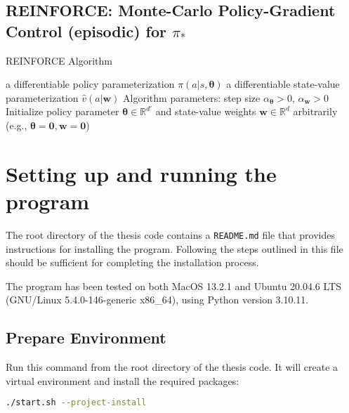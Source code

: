 \documentclass[../xlapes02]{subfiles}
\begin{document}
    \section{REINFORCE: Monte-Carlo Policy-Gradient Control (episodic) for $\pi_*$}
    \begin{algorithm}[h!]
        \caption{REINFORCE Algorithm}
        \label{alg:REINFORCE}

        a differentiable policy parameterization $\pi(a|s, \bm{\theta})$\;
        a differentiable state-value parameterization $\hat{v}(a|\bm{w})$\;
        Algorithm parameters: step size $\alpha_{\bm{\theta}} > 0$, $\alpha_{\bm{w}} > 0$\;
        Initialize policy parameter $\bm{\theta} \in \mathbb{R}^{d'}$ and state-value weights $\bm{w} \in \mathbb{R}^{d}$ arbitrarily (e.g., $\bm{\theta} = \bm{0}, \bm{w} = \bm{0}$)\;

    \end{algorithm}


    \chapter{Setting up and running the program}
    The root directory of the thesis code contains a \texttt{README.md} file that provides instructions for installing the program. Following the steps outlined in this file should be sufficient for completing the installation process.

    The program has been tested on both MacOS 13.2.1 and Ubuntu 20.04.6 LTS (GNU/Linux 5.4.0-146-generic x86\_64), using Python version 3.10.11.


    \section{Prepare Environment}
    Run this command from the root directory of the thesis code. It will create a virtual environment and install the required packages:
    \begin{lstlisting}[language=bash]
./start.sh --project-install
    \end{lstlisting}
\end{document}
